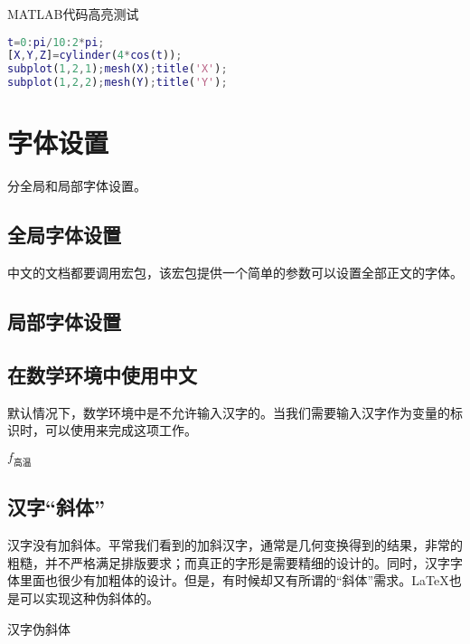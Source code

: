 MATLAB代码高亮测试


\begin{lstlisting}[language=Matlab]
t=0:pi/10:2*pi;
[X,Y,Z]=cylinder(4*cos(t));
subplot(1,2,1);mesh(X);title('X');
subplot(1,2,2);mesh(Y);title('Y');
\end{lstlisting}


\section{字体设置}

分全局和局部字体设置。
\subsection{全局字体设置}
中文的文档都要调用宏包，该宏包提供一个简单的参数可以设置全部正文的字体。

\begin{latex}{}
\setmainfont{Times New Roman}	%
\end{latex}

\subsection{局部字体设置}

\begin{latex}{}
\newfontfamily{}	%
\end{latex}

\subsection{在数学环境中使用中文}
默认情况下，数学环境中是不允许输入汉字的。当我们需要输入汉字作为变量的标识时，可以使用来完成这项工作。

\begin{codeshow}
$f_{\text{高温}}$
\end{codeshow}

\subsection{汉字“斜体”}
汉字没有加斜体。平常我们看到的加斜汉字，通常是几何变换得到的结果，非常的粗糙，并不严格满足排版要求；而真正的字形是需要精细的设计的。同时，汉字字体里面也很少有加粗体的设计。但是，有时候却又有所谓的“斜体”需求。\LaTeX 也是可以实现这种伪斜体的。

\begin{center}
	{汉字伪斜体}
\end{center}

